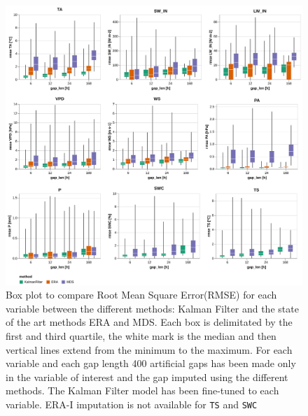 \documentclass{article}
\newcommand{\imgwidth}{6in}
\begin{document}
\begin{figure}
    \centerline{\includegraphics[width=\imgwidth]{the_plot}}
\caption{Box plot to compare Root Mean Square Error(RMSE) for each variable between the different methods: Kalman Filter and the state of the art methods ERA and MDS.  Each box is delimitated by the first and third quartile, the white mark is the median and then vertical lines extend from the minimum to the maximum. For each variable and each gap length 400 artificial gaps has been made only in the variable of interest and the gap imputed using the different methods. The Kalman Filter model has been fine-tuned to each variable. ERA-I imputation is not available for \texttt{TS} and \texttt{SWC}}
\label{fig:the_plot}
\end{figure}


\end{document}
